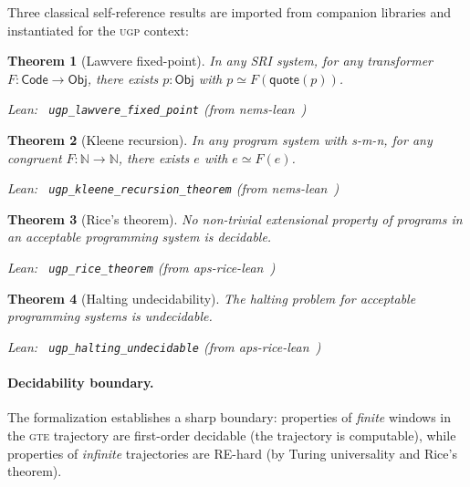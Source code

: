\documentclass[11pt,a4paper]{article}
\newenvironment{leanref}%
  {\par\smallskip\noindent\begingroup\raggedright\textup{Lean:}~}%
  {\par\endgroup}
\newtheorem{theorem}{Theorem}[section]
\theoremstyle{definition}
\newcommand{\ugp}{\textsc{ugp}}
\newcommand{\gte}{\textsc{gte}}
\newcommand{\N}{\mathbb{N}}
\begin{document}
Three classical self-reference results are imported from companion
libraries and instantiated for the \ugp{} context:

\begin{theorem}[Lawvere fixed-point]\label{thm:lawvere}
In any SRI system, for any transformer $F : \mathsf{Code} \to
\mathsf{Obj}$, there exists $p : \mathsf{Obj}$ with
$p \simeq F(\mathsf{quote}(p))$.

\begin{leanref} \lstinline|ugp_lawvere_fixed_point|
\textup{(from nems-lean~\cite{nemsLean2025})}
\end{leanref}
\end{theorem}

\begin{theorem}[Kleene recursion]\label{thm:kleene}
In any program system with s-m-n, for any congruent
$F : \N \to \N$, there exists $e$ with $e \simeq F(e)$.

\begin{leanref} \lstinline|ugp_kleene_recursion_theorem|
\textup{(from nems-lean~\cite{nemsLean2025})}
\end{leanref}
\end{theorem}

\begin{theorem}[Rice's theorem]\label{thm:rice}
No non-trivial extensional property of programs in an acceptable
programming system is decidable.

\begin{leanref} \lstinline|ugp_rice_theorem|
\textup{(from aps-rice-lean~\cite{apsRiceLean2025})}
\end{leanref}
\end{theorem}

\begin{theorem}[Halting undecidability]\label{thm:halting}
The halting problem for acceptable programming systems is undecidable.

\begin{leanref} \lstinline|ugp_halting_undecidable|
\textup{(from aps-rice-lean~\cite{apsRiceLean2025})}
\end{leanref}
\end{theorem}

\paragraph{Decidability boundary.}
The formalization establishes a sharp boundary: properties of
\emph{finite} windows in the \gte{} trajectory are first-order
decidable (the trajectory is computable), while properties of
\emph{infinite} trajectories are RE-hard (by Turing universality and
Rice's theorem).
\end{document}
